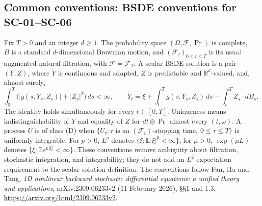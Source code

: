 \documentclass[11pt,a4paper]{article}
\newcommand{\R}{\mathbb R}
\newcommand{\E}{\mathbb E}
\begin{document}
\subsection*{Common conventions: BSDE conventions for SC-01--SC-06}

Fix $T>0$ and an integer $d\geq1$. The probability space
$(\Omega,\mathcal F,\Pr)$ is complete, $B$ is a standard $d$-dimensional
Brownian motion, and $(\mathcal F_t)_{0\leq t\leq T}$ is its usual augmented
natural filtration, with $\mathcal F=\mathcal F_T$. A scalar BSDE solution
is a pair $(Y,Z)$, where $Y$ is continuous and adapted, $Z$ is predictable
and $\R^d$-valued, and, almost surely,
\[
 \int_0^T\bigl(|g(s,Y_s,Z_s)|+|Z_s|^2\bigr)\,ds<\infty,
 \qquad
 Y_t=\xi+\int_t^T g(s,Y_s,Z_s)\,ds-\int_t^T Z_s\cdot dB_s.
\]
The identity holds simultaneously for every $t\in[0,T]$. Uniqueness means
indistinguishability of $Y$ and equality of $Z$ for $dt\otimes\Pr$ almost
every $(t,\omega)$. A process $U$ is of class (D) when
$\{U_\tau:\tau\text{ is an }(\mathcal F_t)\text{-stopping time},\ 0\leq\tau\leq T\}$
is uniformly integrable. For $p>0$, $L^p$ denotes
$\{\xi:\E|\xi|^p<\infty\}$; for $\mu>0$,
$\exp(\mu L)$ denotes $\{\xi:\E e^{\mu|\xi|}<\infty\}$.
These conventions remove ambiguity about filtration, stochastic integration,
and integrability; they do not add an $L^2$ expectation requirement to the
scalar solution definition. The conventions follow Fan, Hu and Tang,
\emph{1D nonlinear backward stochastic differential equations: a unified
theory and applications}, arXiv:2309.06233v2 (11 February 2026),
\S\S1 and 1.3, \url{https://arxiv.org/html/2309.06233v2}.
\end{document}
